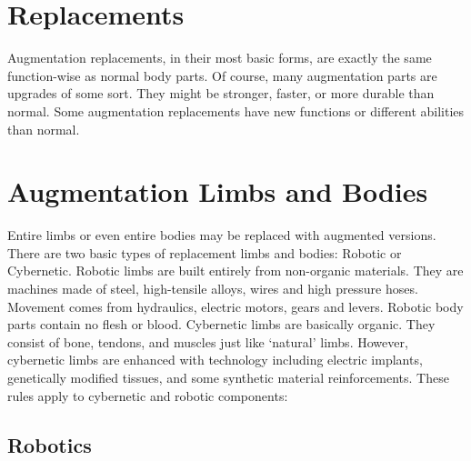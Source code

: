 \documentclass[twoside]{book}
\begin{document}
\section{Replacements}
     Augmentation replacements, in their most basic forms,
             are exactly the same function-wise as normal body parts. Of
             course, many augmentation parts are upgrades of some sort.
             They might be stronger, faster, or more durable than normal.
             Some augmentation replacements have new functions or
             different abilities than normal. 
    

\section{Augmentation Limbs and Bodies}
     Entire limbs or even entire bodies may be replaced
             with augmented versions. There are two basic types of
             replacement limbs and bodies: Robotic or Cybernetic.  Robotic limbs are built entirely from non-organic
             materials. They are machines made of steel, high-tensile
             alloys, wires and high pressure hoses. Movement comes from
             hydraulics, electric motors, gears and levers. Robotic body
             parts contain no flesh or blood.  Cybernetic limbs are basically organic. They consist
             of bone, tendons, and muscles just like
             `natural' limbs. However, cybernetic limbs are
             enhanced with technology including electric implants,
             genetically modified tissues, and some synthetic material
             reinforcements.  These rules apply to cybernetic and robotic
             components: 
    

\subsection{Robotics}
    
\end{document}
